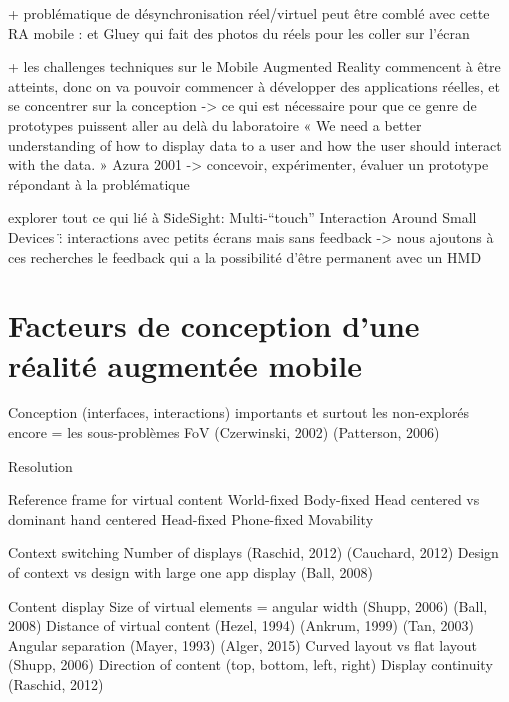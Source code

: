 + problématique de désynchronisation réel/virtuel peut être comblé avec cette RA mobile : \cite{Chalon2004} et Gluey qui fait des photos du réels pour les coller sur l'écran

+ les challenges techniques sur le Mobile Augmented Reality commencent à être atteints, donc on va pouvoir commencer à développer des applications réelles, et se concentrer sur la conception -> ce qui est nécessaire pour que ce genre de prototypes puissent aller au delà du laboratoire
« We need a better understanding of how to display data
to a user and how the user should interact with the data. » Azura 2001
-> concevoir, expérimenter, évaluer un prototype répondant à la problématique

explorer tout ce qui lié à \"SideSight: Multi-“touch” Interaction Around Small Devices \" : interactions avec petits écrans mais sans feedback -> nous ajoutons à ces recherches le feedback qui a la possibilité d'être permanent avec un HMD


\section*{Facteurs de conception d'une réalité augmentée mobile}
Conception (interfaces, interactions) importants et surtout les non-explorés encore = les sous-problèmes
        FoV (Czerwinski, 2002) (Patterson, 2006) \cite{KishishitaKiyokawaOrloskyEtAl2014} 

        Resolution 

        Reference frame for virtual content 
            World-fixed \cite{EnsFinneganIrani2014} 
            Body-fixed \cite{EnsFinneganIrani2014} 
                Head centered vs dominant hand centered 
            Head-fixed \cite{EnsFinneganIrani2014} 
            Phone-fixed
            Movability \cite{EnsHincapie-RamosIrani2014}

        Context switching 
            Number of displays (Raschid, 2012) (Cauchard, 2012) 
            Design of context vs design with large one app display (Ball, 2008) 

        Content display
            Size of virtual elements = angular width (Shupp, 2006) (Ball, 2008) 
            Distance of virtual content (Hezel, 1994) (Ankrum, 1999) (Tan, 2003) \cite{ChanKaoChenEtAl2010} \cite{EnsFinneganIrani2014} 
            Angular separation (Mayer, 1993) \cite{EnsFinneganIrani2014} \cite{KishishitaKiyokawaOrloskyEtAl2014} (Alger, 2015) 
            Curved layout vs flat layout (Shupp, 2006) 
            Direction of content (top, bottom, left, right) \cite{EnsFinneganIrani2014} 
            Display continuity \cite{TanCzerwinski2003} (Raschid, 2012)

